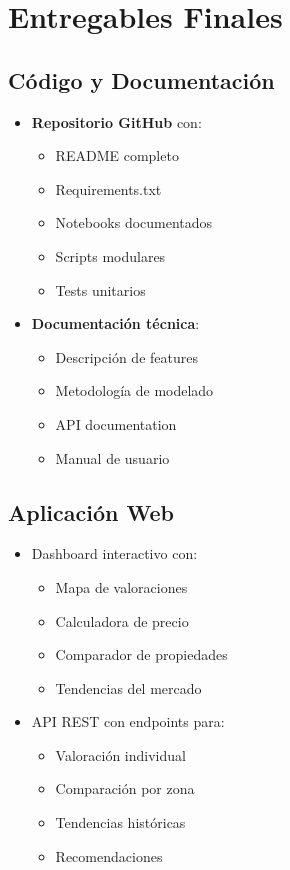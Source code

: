 \documentclass[11pt,a4paper]{article}
\begin{document}
\section{Entregables Finales}

\subsection{Código y Documentación}

\begin{itemize}
    \item \textbf{Repositorio GitHub} con:
    \begin{itemize}
        \item README completo
        \item Requirements.txt
        \item Notebooks documentados
        \item Scripts modulares
        \item Tests unitarios
    \end{itemize}
    
    \item \textbf{Documentación técnica}:
    \begin{itemize}
        \item Descripción de features
        \item Metodología de modelado
        \item API documentation
        \item Manual de usuario
    \end{itemize}
\end{itemize}

\subsection{Aplicación Web}

\begin{itemize}
    \item Dashboard interactivo con:
    \begin{itemize}
        \item Mapa de valoraciones
        \item Calculadora de precio
        \item Comparador de propiedades
        \item Tendencias del mercado
    \end{itemize}
    
    \item API REST con endpoints para:
    \begin{itemize}
        \item Valoración individual
        \item Comparación por zona
        \item Tendencias históricas
        \item Recomendaciones
    \end{itemize}
\end{itemize}
\end{document}
